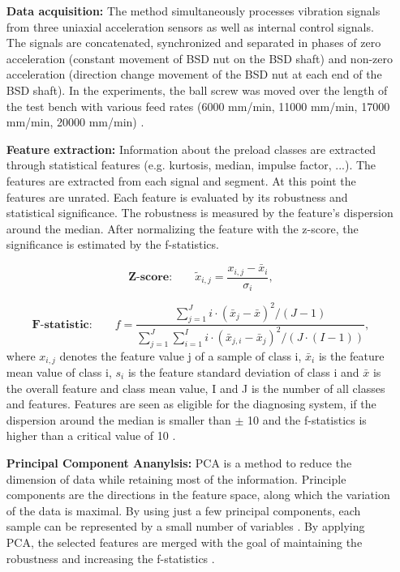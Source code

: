 \begin{itemize}
    \item [\textbf{Data acquisition:}] The method simultaneously processes vibration signals from three uniaxial acceleration sensors as well as internal control signals. The signals are concatenated, synchronized and separated in phases of zero acceleration (constant movement of BSD nut on the BSD shaft) and non-zero acceleration (direction change movement of the BSD nut at each end of the BSD shaft). In the experiments, the ball screw was moved over the length of the test bench with various feed rates (6000 mm/min, 11000 mm/min, 17000 mm/min, 20000 mm/min) \cite{Denkena2021}.
    \item [\textbf{Feature extraction:}] Information about the preload classes are extracted through statistical features (e.g. kurtosis, median, impulse factor, ...). The features are extracted from each signal and segment. At this point the features are unrated. Each feature is evaluated by its robustness and statistical significance. The robustness is measured by the feature's dispersion around the median. After normalizing the feature with the z-score, the significance is estimated by the f-statistics.
    
    \begin{equation}
        \textbf{Z-score:}\qquad \tilde{x}_{i,j} = \frac{x_{i,j} - \bar x_{i}}{\sigma_{i}},
    \end{equation}
    
    \begin{equation}
        \textbf{F-statistic:}\qquad f = \frac{\sum_{j=1}^{J} i \cdot (\bar x_{j} -\bar x)^{2}/(J-1)}{\sum_{j=1}^{J} \sum_{i=1}^{I} i \cdot (\bar x_{j,i} -\bar x_{j})^{2}/(J \cdot (I-1))},
    \end{equation}
    where ${x}_{i,j}$ denotes the feature value j of a sample of class i, $\bar{x}_{i}$ is the feature mean value of class i, ${s}_{i}$ is the feature standard deviation of class i and $\bar{x}$ is the overall feature and class mean value, I and J is the number of all classes and features.  Features are seen as eligible for the diagnosing system, if the dispersion around the median is smaller than $\pm$ 10 and the f-statistics is higher than a critical value of 10 \cite{Denkena2021}. 
    
    \item [\textbf{Principal Component Ananylsis:}] 
    PCA is a method to reduce the dimension of data while retaining most of the information. Principle components are the directions in the feature space, along which the variation of the data is maximal. By using just a few principal components, each sample can be represented by a small number of variables \cite{Ringner2008}. By applying PCA, the selected features are merged with the goal of maintaining the robustness and increasing the f-statistics \cite{Denkena2021}.
    

\end{itemize}
